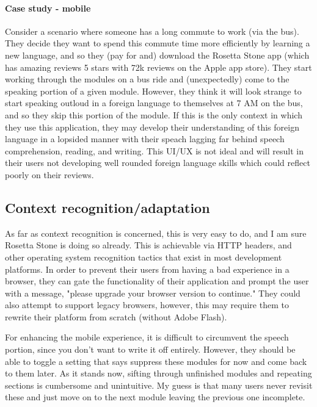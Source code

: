 \paragraph{Case study - mobile}
Consider a scenario where someone has a long commute to work (via the bus). They decide they want to spend this commute time more efficiently by learning a new language, and so they (pay for and) download the Rosetta Stone app (which has amazing reviews 5 stars with 72k reviews on the Apple app store). They start working through the modules on a bus ride and (unexpectedly) come to the speaking portion of a given module. However, they think it will look strange to start speaking outloud in a foreign language to themselves at 7 AM on the bus, and so they skip this portion of the module. If this is the only context in which they use this application, they may develop their understanding of this foreign language in a lopsided manner with their speach lagging far behind speech comprehension, reading, and writing. This UI/UX is not ideal and will result in their users not developing well rounded foreign language skills which could reflect poorly on their reviews.

\subsection{Context recognition/adaptation}

As far as context recognition is concerned, this is very easy to do, and I am sure Rosetta Stone is doing so already. This is achievable via HTTP headers, and other operating system recognition tactics that exist in most development platforms. In order to prevent their users from having a bad experience in a browser, they can gate the functionality of their application and prompt the user with a message, "please upgrade your browser version to continue." They could also attempt to support legacy browsers, however, this may require them to rewrite their platform from scratch (without Adobe Flash).

For enhancing the mobile experience, it is difficult to circumvent the speech portion, since you don't want to write it off entirely. However, they should be able to toggle a setting that says suppress these modules for now and come back to them later. As it stands now, sifting through unfinished modules and repeating sections is cumbersome and unintuitive. My guess is that many users never revisit these and just move on to the next module leaving the previous one incomplete.

